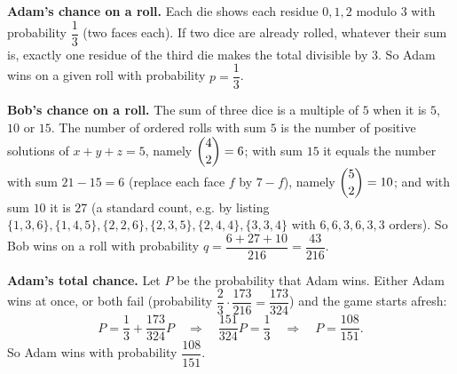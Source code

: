 \textbf{Adam's chance on a roll.} Each die shows each residue $0,1,2$ modulo $3$ with probability $\dfrac13$ (two faces each). If two dice are already rolled, whatever their sum is, exactly one residue of the third die makes the total divisible by $3$. So Adam wins on a given roll with probability $p=\dfrac13$.

\textbf{Bob's chance on a roll.} The sum of three dice is a multiple of $5$ when it is $5$, $10$ or $15$. The number of ordered rolls with sum $5$ is the number of positive solutions of $x+y+z=5$, namely $\dbinom42=6$; with sum $15$ it equals the number with sum $21-15=6$ (replace each face $f$ by $7-f$), namely $\dbinom52=10$; and with sum $10$ it is $27$ (a standard count, e.g. by listing $\{1,3,6\},\{1,4,5\},\{2,2,6\},\{2,3,5\},\{2,4,4\},\{3,3,4\}$ with $6,6,3,6,3,3$ orders). So Bob wins on a roll with probability $q=\dfrac{6+27+10}{216}=\dfrac{43}{216}$.

\textbf{Adam's total chance.} Let $P$ be the probability that Adam wins. Either Adam wins at once, or both fail (probability $\dfrac23\cdot\dfrac{173}{216}=\dfrac{173}{324}$) and the game starts afresh:
\[P=\dfrac13+\dfrac{173}{324}P\quad\Longrightarrow\quad\dfrac{151}{324}P=\dfrac13\quad\Longrightarrow\quad P=\dfrac{108}{151}.\]
So Adam wins with probability $\boxed{\dfrac{108}{151}}$.
